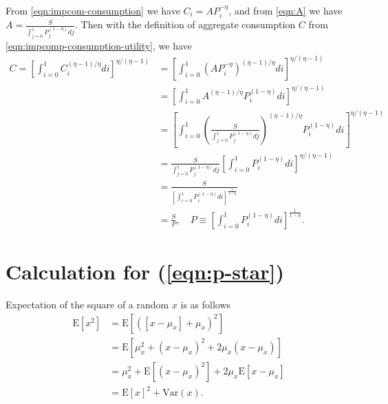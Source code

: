\documentclass{article}
\newcommand{\E}[1]{\mathrm{E}\left[#1\right]}
\newcommand{\var}[1]{\mathrm{Var}\left(#1\right)}
\newcommand{\?}{\textcolor{red}{(?)}} %
\begin{document}
    From \eqref{eqn:impcom-consumption} we have $C_i = A P_i^{-\eta}$, and from \eqref{eqn:A} we have $A = \frac{S}{\int_{j=0}^1 P_j^{(1-\eta)} dj}$. Then with the definition of aggregate consumption $C$ from \eqref{eqn:impcomp-consumption-utility}, we have
    \begin{align}
            C = \left[
                    \int_{i=0}^1 C_i^{(\eta - 1)/\eta} di
                \right]^{\eta / (\eta - 1)}
            &= \left[
                \int_{i=0}^1 (A P_i^{-\eta})^{(\eta - 1)/\eta} di
                \right]^{\eta / (\eta - 1)}
            \\
            &= \left[
                \int_{i=0}^1 A^{(\eta - 1)/\eta} P_i^{(1-\eta)} di
                \right]^{\eta / (\eta - 1)}
            \\
            &= \left[
                \int_{i=0}^1
                \left(\frac{S}{\int_{j=0}^1 P_j^{(1-\eta)} dj}\right)^{(\eta - 1)/\eta}
                P_i^{(1-\eta)}
                di
                \right]^{\eta / (\eta - 1)}
            \\
            &= \frac{S}{\int_{j=0}^1 P_j^{(1-\eta)} dj}
                \left[
                \int_{i=0}^1
                P_i^{(1-\eta)}
                di
                \right]^{\eta / (\eta - 1)}
            \\
            &= \frac{S}{
                \left[
                \int_{i=0}^1
                P_i^{(1-\eta)}
                di
                \right]^{\frac{1}{1 - \eta}}
                }
            \\
            &= \frac{S}{P}, \quad P \equiv \left[
                \int_{i=0}^1
                P_i^{(1-\eta)}
                di
                \right]^{\frac{1}{1 - \eta}}.
        \end{align}
        
        
    \section{Calculation for (\ref{eqn:p-star})}\label{calc:p-star}
        Expectation of the square of a random $x$ is as follows
        \begin{align}
            \E{x^2}
            &= \E{([x - \mu_x] + \mu_x)^2}
            \\
            &= \E{\mu_x^2 + (x - \mu_x)^2 + 2\mu_x(x - \mu_x)}
            \\
            &= \mu_x^2 + \E{(x - \mu_x)^2} + 2\mu_x\E{x - \mu_x}
            \\
            &= \E{x}^2 + \var{x}.
        \end{align}
    
\end{document}
